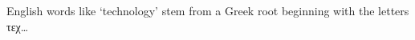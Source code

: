 \RaggedRight
English words like `technology' stem from a
Greek root beginning with the letters τεχ\dots
